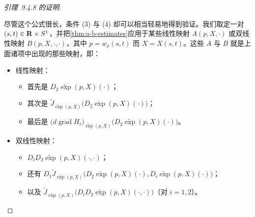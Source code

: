 \begin{proof}[引理~9.4.8 的证明]
\begin{itemize}
尽管这个公式很长，条件 (3) 与 (4) 却可以相当轻易地得到验证。我们取定一对 $(s,t)\in\mathbf{R}\times S^{1}$，并把\cref{thm:a-b-estimates}应用于某些线性映射 $A(p,X,\cdot)$ 或双线性映射 $B(p,X,\cdot,\cdot)$，其中 $p=w_{\rho}(s,t)$ 而 $X=X(s,t)$。这些 $A$ 与 $B$ 就是上面诸项中出现的那些映射，即：
\begin{itemize}
\item[--] 线性映射：
\begin{itemize}
\item 首先是 $D_{2}\widetilde{\exp}(p,X)(\cdot)$；
\item 其次是 $\widetilde{J}_{\widetilde{\exp}(p,X)}\bigl(D_{2}\widetilde{\exp}(p,X)(\cdot)\bigr)$；
\item 最后是 $\bigl(d\operatorname{grad}H_{t}\bigr)_{\widetilde{\exp}(p,X)}\bigl(D_{2}\widetilde{\exp}(p,X)(\cdot)\bigr)$。
\end{itemize}
\item[--] 双线性映射：
\begin{itemize}
\item $D_{i}D_{2}\widetilde{\exp}(p,X)(\cdot,\cdot)$；
\item 还有 $D_{1}\widetilde{J}_{\widetilde{\exp}(p,X)}\bigl(D_{2}\widetilde{\exp}(p,X)(\cdot),D_{i}\widetilde{\exp}(p,X)(\cdot)\bigr)$；
\item 以及 $\widetilde{J}_{\widetilde{\exp}(p,X)}\bigl(D_{i}D_{2}\widetilde{\exp}(p,X)(\cdot,\cdot)\bigr)$（对 $i=1,2$）。
\end{itemize}
\end{itemize}


\end{itemize}
\end{proof}
